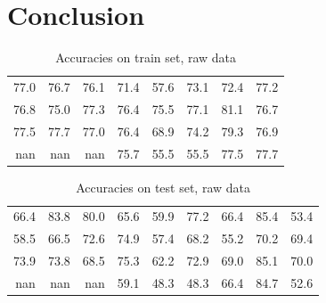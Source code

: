 \documentclass[10pt,conference,compsocconf]{IEEEtran}
\newcommand{\beginsupplement}{%
	\setcounter{table}{0}
	\renewcommand{\thetable}{S\arabic{table}}%
	\setcounter{figure}{0}
	\renewcommand{\thefigure}{S\arabic{figure}}%
}
\begin{document}
\section*{Conclusion}




\beginsupplement

\begin{table}[H]
	\centering
	\begin{tabular}{rrrrrrrr}
\hline
  77.0 &  76.7 &  76.1 & 71.4 & 57.6 & 73.1 & 72.4 & 77.2 \\
  76.8 &  75.0 &  77.3 & 76.4 & 75.5 & 77.1 & 81.1 & 76.7 \\
  77.5 &  77.7 &  77.0 & 76.4 & 68.9 & 74.2 & 79.3 & 76.9 \\
 nan   & nan   & nan   & 75.7 & 55.5 & 55.5 & 77.5 & 77.7 \\
\hline
\end{tabular}
	\caption{Accuracies on train set, raw data}
\end{table}

\begin{table}[H]
	\centering
	\begin{tabular}{rrrrrrrrr}
\hline
  66.4 &  83.8 &  80.0 & 65.6 & 59.9 & 77.2 & 66.4 & 85.4 & 53.4 \\
  58.5 &  66.5 &  72.6 & 74.9 & 57.4 & 68.2 & 55.2 & 70.2 & 69.4 \\
  73.9 &  73.8 &  68.5 & 75.3 & 62.2 & 72.9 & 69.0 & 85.1 & 70.0 \\
 nan   & nan   & nan   & 59.1 & 48.3 & 48.3 & 66.4 & 84.7 & 52.6 \\
\hline
\end{tabular}
	\caption{Accuracies on test set, raw data}
\end{table}
\end{document}
